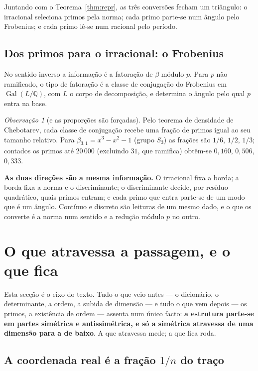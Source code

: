\documentclass[11pt,a4paper]{article}
\theoremstyle{plain}
\theoremstyle{definition}
\theoremstyle{remark}
\newtheorem{obs}[teorema]{Observação}
\newcommand{\Q}{\mathbb{Q}}
\begin{document}
\noindent Juntando com o Teorema~\ref{thm:repr}, as três conversões fecham um triângulo:
o irracional seleciona primos pela norma; cada primo parte-se num ângulo pelo Frobenius; e cada
primo lê-se num racional pelo período.

\subsection{Dos primos para o irracional: o Frobenius}

No sentido inverso a informação é a fatoração de $\beta$ módulo $p$. Para $p$ não ramificado, o tipo
de fatoração é a classe de conjugação do Frobenius em $\operatorname{Gal}(L/\Q)$, com $L$ o corpo de
decomposição, e determina o ângulo pelo qual $p$ entra na base.

\begin{obs}[e as proporções são forçadas]
Pelo teorema de densidade de Chebotarev, cada classe de conjugação recebe uma fração de primos igual
ao seu tamanho relativo. Para $\beta_{3,1} = x^3-x^2-1$ (grupo $S_3$) as frações são $1/6$, $1/2$,
$1/3$; contados os primos até $20\,000$ (excluindo $31$, que ramifica) obtêm-se
$0{,}160$, $0{,}506$, $0{,}333$.
\end{obs}

\noindent \textbf{As duas direções são a mesma informação.} O irracional fixa a borda; a borda fixa
a norma e o discriminante; o discriminante decide, por resíduo quadrático, quais primos entram; e
cada primo que entra parte-se de um modo que é um ângulo. Contínuo e discreto são leituras de um
mesmo dado, e o que os converte é a norma num sentido e a redução módulo $p$ no outro.

\section{O que atravessa a passagem, e o que fica}\label{sec:passagem}

Esta secção é o eixo do texto. Tudo o que veio antes --- o dicionário, o determinante, a ordem, a
subida de dimensão --- e tudo o que vem depois --- os primos, a existência de ordem --- assenta num
único facto: \textbf{a estrutura parte-se em partes simétrica e antissimétrica, e só a simétrica
atravessa de uma dimensão para a de baixo}. A que atravessa mede; a que fica roda.

\subsection{A coordenada real é a fração \texorpdfstring{$1/n$}{1/n} do traço}\label{sec:umsobren}
\end{document}
